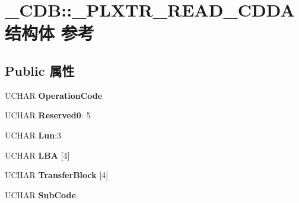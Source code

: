 \hypertarget{struct___c_d_b_1_1___p_l_x_t_r___r_e_a_d___c_d_d_a}{}\section{\+\_\+\+C\+DB\+:\+:\+\_\+\+P\+L\+X\+T\+R\+\_\+\+R\+E\+A\+D\+\_\+\+C\+D\+D\+A结构体 参考}
\label{struct___c_d_b_1_1___p_l_x_t_r___r_e_a_d___c_d_d_a}
\subsection*{Public 属性}
\begin{DoxyCompactItemize}
\item 
\mbox{\label{struct___c_d_b_1_1___p_l_x_t_r___r_e_a_d___c_d_d_a_aa0c14ebcb3c5cdda5d859e0750ff4808}} 
U\+C\+H\+AR {\bfseries Operation\+Code}
\item 
\mbox{\label{struct___c_d_b_1_1___p_l_x_t_r___r_e_a_d___c_d_d_a_af3d88f81461ccfd0a134ef66f33ba7d2}} 
U\+C\+H\+AR {\bfseries Reserved0}\+: 5
\item 
\mbox{\label{struct___c_d_b_1_1___p_l_x_t_r___r_e_a_d___c_d_d_a_adb1e82b86b64da4760152f1f6f1056cf}} 
U\+C\+H\+AR {\bfseries Lun}\+:3
\item 
\mbox{\label{struct___c_d_b_1_1___p_l_x_t_r___r_e_a_d___c_d_d_a_a78fb77676b9353fa7aef7d8766f457dc}} 
U\+C\+H\+AR {\bfseries L\+BA} \mbox{[}4\mbox{]}
\item 
\mbox{\label{struct___c_d_b_1_1___p_l_x_t_r___r_e_a_d___c_d_d_a_a40aff46919b88a9b2824d1425e01ec01}} 
U\+C\+H\+AR {\bfseries Transfer\+Block} \mbox{[}4\mbox{]}
\item 
\mbox{\label{struct___c_d_b_1_1___p_l_x_t_r___r_e_a_d___c_d_d_a_ac48ddfaecfe83253d0985c1ecda63475}} 
U\+C\+H\+AR {\bfseries Sub\+Code}
\item 
\mbox{\label{struct___c_d_b_1_1___p_l_x_t_r___r_e_a_d___c_d_d_a_a1cdef73f444fdaf5b74dde2e926d4380}} 

\end{DoxyCompactItemize}
